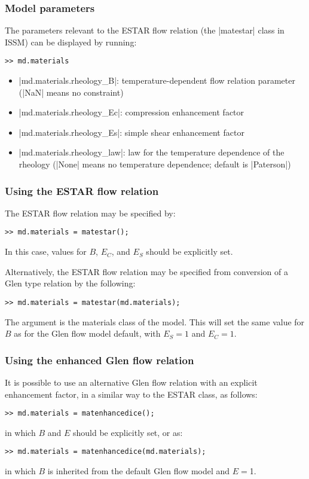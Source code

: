 \subsubsection{Model parameters}
The parameters relevant to the ESTAR flow relation (the \lstinlinebg|matestar| class in ISSM) can be displayed by running:
\begin{lstlisting}
>> md.materials
\end{lstlisting}

\begin{itemize}
	\item \lstinlinebg|md.materials.rheology_B|: temperature-dependent flow relation parameter (\lstinlinebg|NaN| means no constraint)
	\item \lstinlinebg|md.materials.rheology_Ec|: compression enhancement factor
	\item \lstinlinebg|md.materials.rheology_Es|: simple shear enhancement factor
	\item \lstinlinebg|md.materials.rheology_law|: law for the temperature dependence of the rheology (\lstinlinebg|None| means no temperature dependence; default is \lstinlinebg|Paterson|)
\end{itemize}

\subsubsection{Using the ESTAR flow relation}
The ESTAR flow relation may be specified by:
\begin{lstlisting}
>> md.materials = matestar();
\end{lstlisting}
In this case, values for $B$, $E_C$, and $E_S$ should be explicitly set.

Alternatively, the ESTAR flow relation may be specified from conversion of a Glen type relation by the following:
\begin{lstlisting}
>> md.materials = matestar(md.materials);
\end{lstlisting}
The argument is the materials class of the model. This will set the same value for $B$ as for the Glen flow model default, with $E_S=1$ and $E_C=1$.

\subsubsection{Using the enhanced Glen flow relation}
It is possible to use an alternative Glen flow relation with an explicit enhancement factor, in a similar way to the ESTAR class, as follows:
\begin{lstlisting}
>> md.materials = matenhancedice();
\end{lstlisting}
in which $B$ and $E$ should be explicitly set, or as:
\begin{lstlisting}
>> md.materials = matenhancedice(md.materials);
\end{lstlisting}
in which $B$ is inherited from the default Glen flow model and $E$$=$1.

\clearpage %

